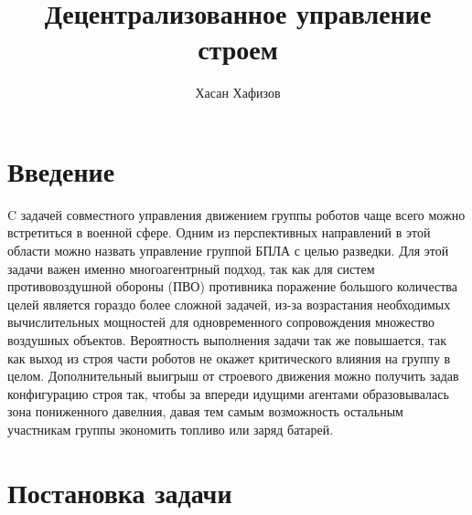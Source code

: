 \documentclass[12pt,a4paper]{article}
\author{Хасан Хафизов}
\title{Децентрализованное управление строем}
\begin{document}
	\maketitle
	\tableofcontents
\section{Введение}
C задачей совместного управления движением группы роботов чаще всего можно встретиться в военной сфере. Одним из перспективных направлений в этой области можно назвать управление группой БПЛА с целью разведки. Для этой задачи важен именно многоагентрный подход, так как для систем противовоздушной обороны (ПВО) противника поражение большого количества целей является гораздо более сложной задачей, из-за возрастания необходимых вычислительных мощностей для одновременного сопровождения множество воздушных объектов. Вероятность выполнения задачи так же повышается, так как выход из строя части роботов не окажет критического влияния на группу в целом. Дополнительный выигрыш от строевого движения можно получить задав конфигурацию строя так, чтобы за впереди идущими агентами образовывалась зона пониженного давелния, давая тем самым  возможность остальным участникам группы экономить топливо или заряд батарей.
\section{Постановка задачи}
\end{document}
